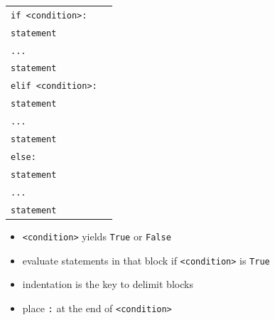 \documentclass[t,handout,9pt]{beamer}
\begin{document}
\begin{frame}
{\begin{minipage}[t]{0.3\textwidth}
\vspace{-0.4cm}
\begin{table}[]
\begin{flushleft}
\begin{tabular}{ll}
\texttt{if <condition>:} &  \\
\texttt{\qquad statement}        & \\
\texttt{\qquad ...}        & \\
\texttt{\qquad statement}        & \\
\texttt{elif <condition>:} &  \\
\texttt{\qquad statement}        & \\
\texttt{\qquad ...}        & \\
\texttt{\qquad statement}        & \\
\texttt{else:} &  \\
\texttt{\qquad statement}        & \\
\texttt{\qquad ...}        & \\
\texttt{\qquad statement}        & \\
\end{tabular}
\end{flushleft}
\end{table}
\end{minipage}}
\begin{itemize}
	\item \texttt{<condition>} yields \texttt{True} or \texttt{False}
	\item evaluate statements in that block if \texttt{<condition>} is \texttt{True}
	\item indentation is the key to delimit blocks
	\item place \texttt{:} at the end of \texttt{<condition>}
\end{itemize}
\end{frame}
%
\end{document}
